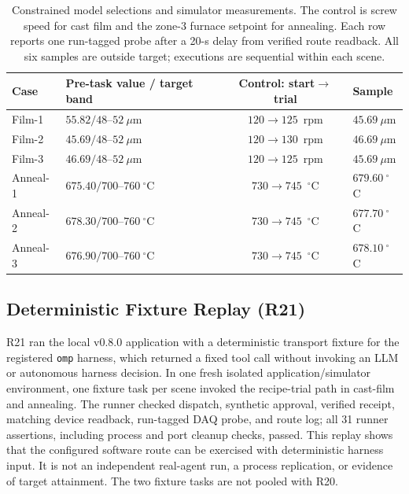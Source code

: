 \begin{table}[!t]
\centering
\caption{Constrained model selections and simulator measurements. The control
is screw speed for cast film and the zone-3 furnace setpoint for annealing.
Each row reports one run-tagged probe after a 20-s delay from verified route
readback. All six samples are outside target; executions are sequential within
each scene.}
\label{tab:q8}
\footnotesize
\setlength{\tabcolsep}{2.5pt}
\begin{tabularx}{\columnwidth}{@{}lXcX@{}}
\toprule
Case & Pre-task value / target band & Control: start$\to$trial & Sample \\
\midrule
Film-1 & $55.82/48$--$52~\mu$m & $120\to125$~rpm & $45.69~\mu$m \\
Film-2 & $45.69/48$--$52~\mu$m & $120\to130$~rpm & $46.69~\mu$m \\
Film-3 & $46.69/48$--$52~\mu$m & $120\to125$~rpm & $45.69~\mu$m \\
Anneal-1 & $675.40/700$--$760~^{\circ}$C & $730\to745$~$^{\circ}$C & $679.60~^{\circ}$C \\
Anneal-2 & $678.30/700$--$760~^{\circ}$C & $730\to745$~$^{\circ}$C & $677.70~^{\circ}$C \\
Anneal-3 & $676.90/700$--$760~^{\circ}$C & $730\to745$~$^{\circ}$C & $678.10~^{\circ}$C \\
\bottomrule
\end{tabularx}
\end{table}

\subsection{Deterministic Fixture Replay (R21)}
R21 ran the local v0.8.0 application with a deterministic transport fixture
for the registered \texttt{omp} harness,
which returned a fixed tool call without invoking an LLM or autonomous harness
decision. In one fresh isolated application/simulator environment, one fixture
task per scene invoked the recipe-trial path in cast-film and annealing. The
runner checked dispatch, synthetic approval, verified receipt, matching device
readback, run-tagged DAQ probe, and route log; all 31 runner assertions,
including process and port cleanup checks, passed. This replay shows that the
configured software route can be exercised with deterministic harness input.
It is not an independent real-agent run, a process replication, or evidence of
target attainment. The two fixture tasks are not pooled with R20.


